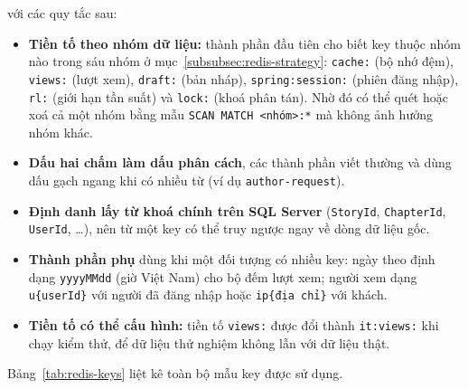 với các quy tắc sau:

\begin{itemize}
    \item \textbf{Tiền tố theo nhóm dữ liệu:} thành phần đầu tiên cho biết key thuộc nhóm nào trong sáu nhóm ở mục~\ref{subsubsec:redis-strategy}: \texttt{cache:} (bộ nhớ đệm), \texttt{views:} (lượt xem), \texttt{draft:} (bản nháp), \texttt{spring:session:} (phiên đăng nhập), \texttt{rl:} (giới hạn tần suất) và \texttt{lock:} (khoá phân tán). Nhờ đó có thể quét hoặc xoá cả một nhóm bằng mẫu \texttt{SCAN MATCH <nhóm>:*} mà không ảnh hưởng nhóm khác.
    \item \textbf{Dấu hai chấm làm dấu phân cách}, các thành phần viết thường và dùng dấu gạch ngang khi có nhiều từ (ví dụ \texttt{author-request}).
    \item \textbf{Định danh lấy từ khoá chính trên SQL Server} (\texttt{StoryId}, \texttt{ChapterId}, \texttt{UserId}, \ldots), nên từ một key có thể truy ngược ngay về dòng dữ liệu gốc.
    \item \textbf{Thành phần phụ} dùng khi một đối tượng có nhiều key: ngày theo định dạng \texttt{yyyyMMdd} (giờ Việt Nam) cho bộ đếm lượt xem; người xem dạng \texttt{u\{userId\}} với người đã đăng nhập hoặc \texttt{ip\{địa chỉ\}} với khách.
    \item \textbf{Tiền tố có thể cấu hình:} tiền tố \texttt{views:} được đổi thành \texttt{it:views:} khi chạy kiểm thử, để dữ liệu thử nghiệm không lẫn với dữ liệu thật.
\end{itemize}

Bảng~\ref{tab:redis-keys} liệt kê toàn bộ mẫu key được sử dụng.

